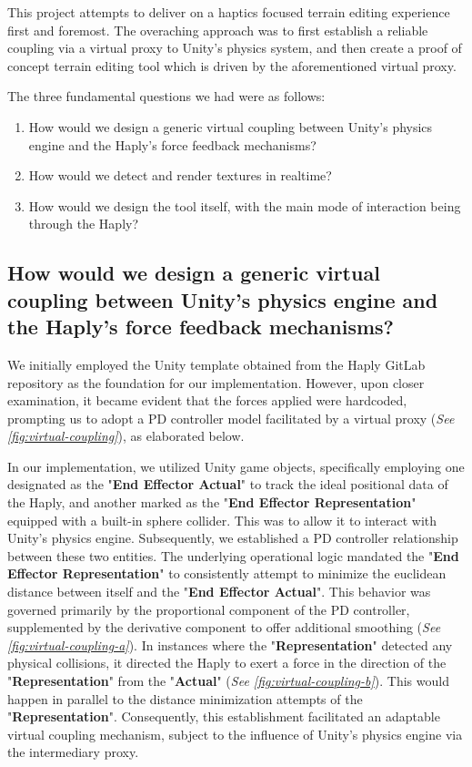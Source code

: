 This project attempts to deliver on a haptics focused terrain editing experience first and foremost. The overaching approach was to first establish a reliable coupling via a virtual proxy to Unity's physics system, and then create a proof of concept terrain editing tool which is driven by the aforementioned virtual proxy.

The three fundamental questions we had were as follows:

\begin{enumerate}
    \item How would we design a generic virtual coupling between Unity's physics engine and the Haply's force feedback mechanisms?
    \item How would we detect and render textures in realtime?
    \item How would we design the tool itself, with the main mode of interaction being through the Haply?
\end{enumerate}

\subsection{How would we design a generic virtual coupling between Unity's physics engine and the Haply's force feedback mechanisms?}

We initially employed the Unity template obtained from the Haply GitLab repository as the foundation for our implementation. However, upon closer examination, it became evident that the forces applied were hardcoded, prompting us to adopt a PD controller model \cite{mathworksPID} facilitated by a virtual proxy (\textit{See \ref*{fig:virtual-coupling}}), as elaborated below.

In our implementation, we utilized Unity game objects, specifically employing one designated as the "\textbf{End Effector Actual}" to track the ideal positional data of the Haply, and another marked as the "\textbf{End Effector Representation}" equipped with a built-in sphere collider. This was to allow it to interact with Unity's physics engine. Subsequently, we established a PD controller relationship between these two entities. The underlying operational logic mandated the "\textbf{End Effector Representation}" to consistently attempt to minimize the euclidean distance between itself and the "\textbf{End Effector Actual}". This behavior was governed primarily by the proportional component of the PD controller, supplemented by the derivative component to offer additional smoothing (\textit{See \ref*{fig:virtual-coupling-a}}). In instances where the "\textbf{Representation}" detected any physical collisions, it directed the Haply to exert a force in the direction of the "\textbf{Representation}" from the "\textbf{Actual}" (\textit{See \ref*{fig:virtual-coupling-b}}). This would happen in parallel to the distance minimization attempts of the "\textbf{Representation}". Consequently, this establishment facilitated an adaptable virtual coupling mechanism, subject to the influence of Unity's physics engine via the intermediary proxy.

